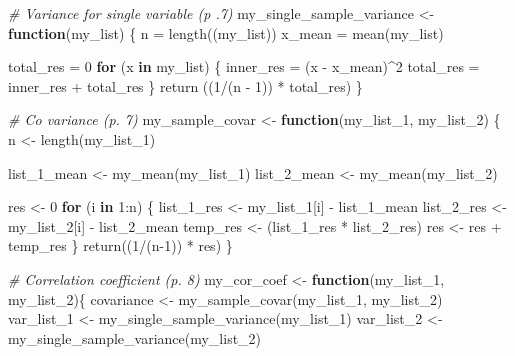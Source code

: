 \documentclass[
]{article}
\newenvironment{Shaded}{\begin{snugshade}}{\end{snugshade}}
\newcommand{\CommentTok}[1]{\textcolor[rgb]{0.56,0.35,0.01}{\textit{#1}}}
\newcommand{\ControlFlowTok}[1]{\textcolor[rgb]{0.13,0.29,0.53}{\textbf{#1}}}
\newcommand{\DecValTok}[1]{\textcolor[rgb]{0.00,0.00,0.81}{#1}}
\newcommand{\FunctionTok}[1]{\textcolor[rgb]{0.00,0.00,0.00}{#1}}
\newcommand{\NormalTok}[1]{#1}
\newcommand{\OtherTok}[1]{\textcolor[rgb]{0.56,0.35,0.01}{#1}}
\newcommand{\SpecialCharTok}[1]{\textcolor[rgb]{0.00,0.00,0.00}{#1}}
\begin{document}
\begin{Shaded}
\begin{Highlighting}[]
\CommentTok{\# Variance for single variable (p .7)}
\NormalTok{my\_single\_sample\_variance }\OtherTok{\textless{}{-}} \ControlFlowTok{function}\NormalTok{(my\_list) \{}
\NormalTok{  n }\OtherTok{=} \FunctionTok{length}\NormalTok{((my\_list))}
\NormalTok{  x\_mean }\OtherTok{=} \FunctionTok{mean}\NormalTok{(my\_list)}
  
\NormalTok{  total\_res }\OtherTok{=} \DecValTok{0}
  \ControlFlowTok{for}\NormalTok{ (x }\ControlFlowTok{in}\NormalTok{ my\_list) \{}
\NormalTok{    inner\_res }\OtherTok{=}\NormalTok{ (x }\SpecialCharTok{{-}}\NormalTok{ x\_mean)}\SpecialCharTok{\^{}}\DecValTok{2}
\NormalTok{    total\_res }\OtherTok{=}\NormalTok{ inner\_res }\SpecialCharTok{+}\NormalTok{ total\_res}
\NormalTok{  \}}
  \FunctionTok{return}\NormalTok{ ((}\DecValTok{1}\SpecialCharTok{/}\NormalTok{(n }\SpecialCharTok{{-}} \DecValTok{1}\NormalTok{)) }\SpecialCharTok{*}\NormalTok{ total\_res)}
\NormalTok{\}}

\CommentTok{\# Co variance (p. 7)}
\NormalTok{my\_sample\_covar }\OtherTok{\textless{}{-}} \ControlFlowTok{function}\NormalTok{(my\_list\_1, my\_list\_2) \{}
\NormalTok{  n }\OtherTok{\textless{}{-}} \FunctionTok{length}\NormalTok{(my\_list\_1)}

\NormalTok{  list\_1\_mean }\OtherTok{\textless{}{-}} \FunctionTok{my\_mean}\NormalTok{(my\_list\_1)}
\NormalTok{  list\_2\_mean }\OtherTok{\textless{}{-}} \FunctionTok{my\_mean}\NormalTok{(my\_list\_2)}
  
\NormalTok{  res }\OtherTok{\textless{}{-}} \DecValTok{0}
  \ControlFlowTok{for}\NormalTok{ (i }\ControlFlowTok{in} \DecValTok{1}\SpecialCharTok{:}\NormalTok{n) \{}
\NormalTok{    list\_1\_res }\OtherTok{\textless{}{-}}\NormalTok{ my\_list\_1[i] }\SpecialCharTok{{-}}\NormalTok{ list\_1\_mean}
\NormalTok{    list\_2\_res }\OtherTok{\textless{}{-}}\NormalTok{ my\_list\_2[i] }\SpecialCharTok{{-}}\NormalTok{ list\_2\_mean}
\NormalTok{    temp\_res }\OtherTok{\textless{}{-}}\NormalTok{ (list\_1\_res }\SpecialCharTok{*}\NormalTok{ list\_2\_res)}
\NormalTok{    res }\OtherTok{\textless{}{-}}\NormalTok{ res }\SpecialCharTok{+}\NormalTok{ temp\_res}
\NormalTok{  \}}
  \FunctionTok{return}\NormalTok{((}\DecValTok{1}\SpecialCharTok{/}\NormalTok{(n}\DecValTok{{-}1}\NormalTok{)) }\SpecialCharTok{*}\NormalTok{ res)}
\NormalTok{\}}

\CommentTok{\# Correlation coefficient (p. 8)}
\NormalTok{my\_cor\_coef }\OtherTok{\textless{}{-}} \ControlFlowTok{function}\NormalTok{(my\_list\_1, my\_list\_2)\{}
\NormalTok{  covariance }\OtherTok{\textless{}{-}} \FunctionTok{my\_sample\_covar}\NormalTok{(my\_list\_1, my\_list\_2)}
\NormalTok{  var\_list\_1 }\OtherTok{\textless{}{-}} \FunctionTok{my\_single\_sample\_variance}\NormalTok{(my\_list\_1)}
\NormalTok{  var\_list\_2 }\OtherTok{\textless{}{-}} \FunctionTok{my\_single\_sample\_variance}\NormalTok{(my\_list\_2)}
  

\end{Highlighting}
\end{Shaded}
\end{document}
